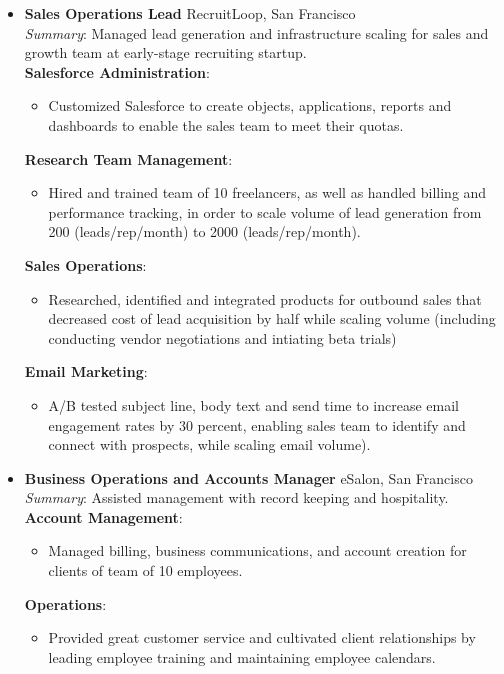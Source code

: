 \documentclass[]{friggeri-cv}
\renewenvironment{entrylist}{%
  \begin{itemize}[leftmargin=1in] %
}{%
  \end{itemize}
}
\renewcommand{\entry}[4]{%
  \item[#1]
    \textbf{#2}%
    \hfill%
    {\footnotesize\addfontfeature{Color=lightgray} #3}\\%
    #4\vspace{\parsep}%
  }
\begin{document}
\begin{entrylist}

  \entry
    {07/14---curr.}
    {Sales Operations Lead}
    {RecruitLoop, San Francisco}
    {\textit{Summary}: Managed lead generation and infrastructure scaling for sales and growth team at early-stage recruiting startup.\\

\textbf {Salesforce Administration}: 
\begin{itemize}
\item Customized Salesforce to create objects, applications, reports and dashboards to enable the sales team to meet their quotas.
\end{itemize}

\textbf {Research Team Management}:
\begin{itemize}
\item Hired and trained team of 10 freelancers, as well as handled billing and performance tracking, in order to scale volume of lead generation from 200 (leads/rep/month) to 2000 (leads/rep/month).
\end{itemize}

\textbf {Sales Operations}: 
\begin{itemize}
\item Researched, identified and integrated products for outbound sales that decreased cost of lead acquisition by half while scaling volume (including conducting vendor negotiations and intiating beta trials)
\end{itemize}

\textbf {Email Marketing}: 
\begin{itemize}
\item A/B tested subject line, body text and send time to increase email engagement rates by 30 percent, enabling sales team to identify and connect with prospects, while scaling email volume).
\end{itemize}
}

   \entry
    {12/13---04/14}
    {Business Operations and Accounts Manager}
    {eSalon, San Francisco}
    {
\textit{Summary}: Assisted management with record keeping and hospitality.\\ 

\textbf {Account Management}: 
\begin{itemize}
\item Managed billing, business communications, and account creation for clients of team of 10 employees.
\end{itemize}

\textbf {Operations}: 
\begin{itemize}
\item Provided great customer service and cultivated client relationships by leading employee training and maintaining employee calendars.
\end{itemize}
}
\end{entrylist}	
\end{document}
